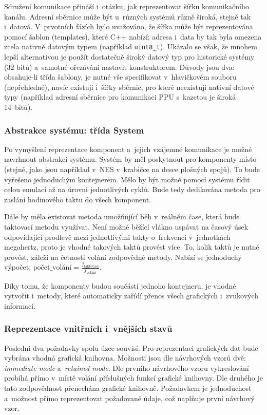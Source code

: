 Sdružení komunikace přináší i~otázku, jak reprezentovat šířku komunikačního kanálu. Adresní sběrnice může být u~různých systémů různě široká, stejně tak i~datová. V~prvotních fázích bylo uvažováno, že šířka může být reprezentována pomocí šablon (templates), které C++ nabízí; adresa i~data by tak byla omezena zcela nativně datovým typem (například \texttt{uint8\_t}). Ukázalo se však, že mnohem lepší alternativou je použít dostatečně široký datový typ pro historické systémy (32 bitů) a~samotné ořezávání nastavit konstruktorem. Důvody jsou dva: obsahuje-li třída šablony, je nutné vše specifikovat v~hlavičkovém souboru (nepřehledné), navíc existují i~šířky sběrnic, pro které neexistují nativní datové typy (například adresní sběrnice pro komunikaci PPU s~kazetou je široká 14~bitů).

\subsubsection{Abstrakce systému: třída System}
Po vymyšlení reprezentace komponent a~jejich vzájemné komunikace je možné navrhnout abstrakci systému. Systém by měl poskytnout pro komponenty místo (stejně, jako jsou například v~NES v~krabičce na desce plošných spojů). To bude vyřešeno jednoduchým kontejnerem. Mělo by být možné pomocí systému řídit celou emulaci až na úrovni jednotlivých cyklů. Bude tedy dedikována metoda pro zaslání hodinového taktu do všech komponent.

Dále by měla existovat metoda umožňující běh v~reálném čase, která bude taktovací metodu využívat. Není možné běžící vlákno uspávat na časový úsek odpovídající prodlevě mezi jednotlivými takty o~frekvenci v~jednotkách megahertz, proto je vhodné takových taktů provést více. To, kolik taktů je nutné provést, záleží na četnosti volání zodpovědné metody. Nabízí se jednoduchý výpočet: $\textrm{počet\_volání} = \frac{f_{\textrm{taktovací}}}{f_{\textrm{volání}}}$.

Díky tomu, že komponenty budou součástí jednoho kontejneru, je vhodné vytvořit i~metody, které automaticky zařídí přenos všech grafických i~zvukových informací.

\subsubsection{Reprezentace vnitřních i~vnějších stavů}
Poslední dva požadavky spolu úzce souvisí. Pro reprezentaci grafických dat bude vybrána vhodná grafická knihovna. Možnosti jsou dle návrhových vzorů dvě: \emph{immediate mode} a~\emph{retained mode}. Dle prvního návrhového vzoru vykreslování probíhá přímo v~místě volání příslušných funkcí grafické knihovny. Dle druhého je tato zodpovědnost přenechána grafické knihovně. Požadavkem je jednoduchost a~možnost přímo reprezentovat požadované údaje, což naplňuje první návrhový vzor.

